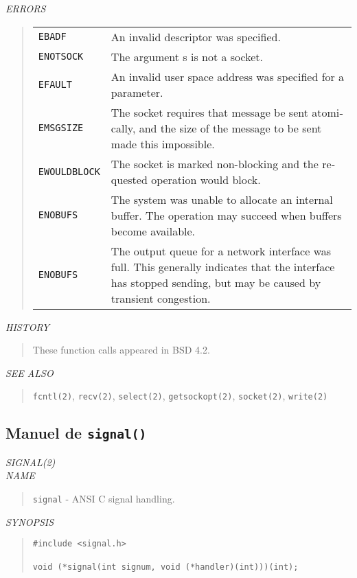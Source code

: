 \begin{appendix}
\begin{english}
{\sl ERRORS}
\begin{quote}
\begin{tabular}{lp{8cm}}
	{\tt EBADF} &
		An invalid descriptor was specified.\\
	{\tt ENOTSOCK} &
		The argument s is not a socket.\\
	{\tt EFAULT} &
		An invalid user space address was specified for a
		parameter.\\
	{\tt EMSGSIZE} &
		The socket requires that message be sent atomically,
		and the size of the message to be sent made
		this impossible.\\
	{\tt EWOULDBLOCK} &
		The socket is marked non-blocking and the
		requested operation would block.\\
	{\tt ENOBUFS} &
		The system was unable to allocate an internal
		buffer. The operation may succeed when buffers
		become available.\\
	{\tt ENOBUFS} &
		The output queue for a network interface was full.
		This generally indicates that the interface has
		stopped sending, but may be caused by transient
		congestion.
\end{tabular}
\end{quote}

{\sl HISTORY}
\begin{quote}
	These function calls appeared in BSD 4.2.
\end{quote}

{\sl SEE ALSO}
\begin{quote}
	{\tt fcntl(2)}, {\tt recv(2)}, {\tt select(2)}, {\tt getsockopt(2)},
	{\tt socket(2)}, {\tt write(2)}
\end{quote}
\end{english}

\subsection{Manuel de {\tt signal()}}
\begin{english}
{\sl SIGNAL(2)}\\

{\sl NAME}
\begin{quote}
	{\tt signal} - ANSI C signal handling.
\end{quote}

{\sl SYNOPSIS}
\begin{quote}
\begin{verbatim}
#include <signal.h>

void (*signal(int signum, void (*handler)(int)))(int);
\end{verbatim}
\end{quote}


\end{english}
\end{appendix}
